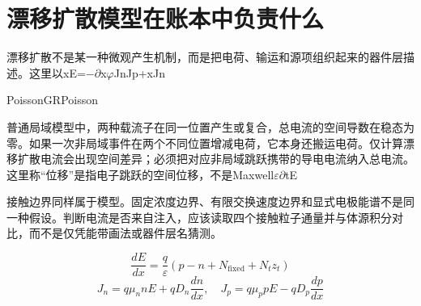 \documentclass[11pt,a4paper]{article}
\begin{document}
\section{{\cjkfont 漂移扩散模型在账本中负责什么}\allowbreak{}}\label{sec:10}
{\cjkfont 漂移扩散不是某一种微观产生机制，而是把电荷、输运和源项组织起来的器件层描述。这里以}\allowbreak{}x\allowbreak{}E=\allowbreak{}−\ensuremath{\partial}x\ensuremath{\varphi}\allowbreak{}Jn\allowbreak{}Jp\allowbreak{}+x\allowbreak{}Jn\allowbreak{}
\par
Poisson\allowbreak{}G\allowbreak{}R\allowbreak{}Poisson\allowbreak{}
\par
{\cjkfont 普通局域模型中，两种载流子在同一位置产生或复合，总电流的空间导数在稳态为零。如果一次非局域事件在两个不同位置增减电荷，它本身还搬运电荷。仅计算漂移扩散电流会出现空间差异；必须把对应非局域跳跃携带的导电电流纳入总电流。这里称“位移”是指电子跳跃的空间位移，不是}\allowbreak{}Maxwell\allowbreak{}\ensuremath{\varepsilon}\ensuremath{\partial}tE\allowbreak{}
\par
{\cjkfont 接触边界同样属于模型。固定浓度边界、有限交换速度边界和显式电极能谱不是同一种假设。判断电流是否来自注入，应该读取四个接触粒子通量并与体源积分对比，而不是仅凭能带画法或器件层名猜测。}\allowbreak{}
\par
\begin{equation}
\frac{dE}{dx}=\frac{q}{\varepsilon}(p-n+N_{\mathrm{fixed}}+N_t z_t)
\label{eq:4}\end{equation}
\begin{equation}
J_n=q\mu_n nE+qD_n\frac{dn}{dx},\quad J_p=q\mu_p pE-qD_p\frac{dp}{dx}
\label{eq:5}\end{equation}
\end{document}
